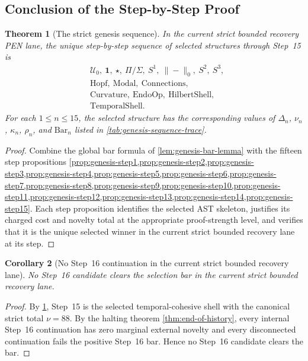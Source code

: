 \documentclass[11pt,a4paper]{article}
\theoremstyle{plain}
\newtheorem{theorem}{Theorem}[section]
\newtheorem{corollary}[theorem]{Corollary}
\theoremstyle{definition}
\theoremstyle{remark}
\newcommand{\U}{\mathcal{U}}
\begin{document}
\subsection{Conclusion of the Step-by-Step Proof}
\label{subsec:genesis-proof-conclusion}

\begin{theorem}[The strict genesis sequence]
\label{thm:strict-genesis-sequence}
In the current strict bounded recovery PEN lane, the unique step-by-step sequence of
selected structures through Step~15 is
\[
  \begin{aligned}
    &\U_0,\ \mathbf{1},\ \star,\ \Pi/\Sigma,\ S^1,\ \|{-}\|_0,\ S^2,\ S^3,\\
    &\mathrm{Hopf},\ \mathrm{Modal},\ \mathrm{Connections},\\
    &\mathrm{Curvature},\ \mathrm{EndoOp},\ \mathrm{HilbertShell},\\
    &\mathrm{TemporalShell}.
  \end{aligned}
\]
For each $1\le n\le 15$, the selected structure has the corresponding values of
$\Delta_n$, $\nu_n$, $\kappa_n$, $\rho_n$, and $\mathrm{Bar}_n$ listed in
\cref{tab:genesis-sequence-trace}.
\end{theorem}

\begin{proof}
Combine the global bar formula of \cref{lem:genesis-bar-lemma} with the fifteen
step propositions
\cref{prop:genesis-step1,prop:genesis-step2,prop:genesis-step3,prop:genesis-step4,prop:genesis-step5,prop:genesis-step6,prop:genesis-step7,prop:genesis-step8,prop:genesis-step9,prop:genesis-step10,prop:genesis-step11,prop:genesis-step12,prop:genesis-step13,prop:genesis-step14,prop:genesis-step15}.
Each step proposition identifies the selected AST skeleton, justifies its charged
cost and novelty total at the appropriate proof-strength level, and verifies
that it is the unique selected winner in the current strict bounded recovery lane at its step.
\end{proof}

\begin{corollary}[No Step~16 continuation in the current strict bounded recovery lane]
\label{cor:genesis-no-step16}
No Step~16 candidate clears the selection bar in the current strict bounded recovery
lane.
\end{corollary}

\begin{proof}
By \cref{thm:strict-genesis-sequence}, Step~15 is the selected temporal-cohesive
shell with the canonical strict total $\nu=88$.
By the halting theorem \cref{thm:end-of-history}, every internal Step~16
continuation has zero marginal external novelty and every disconnected
continuation fails the positive Step~16 bar.
Hence no Step~16 candidate clears the bar.
\end{proof}
\end{document}

